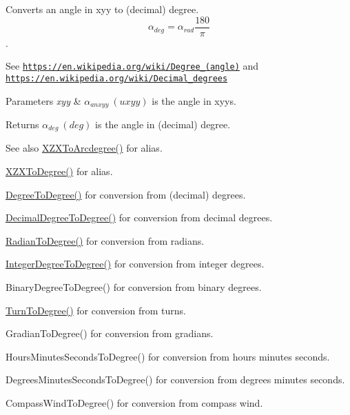 Converts an angle in xyy to (decimal) degree. \[\alpha_{deg}=\alpha_{rad}\frac{180}{\pi}\]. 

See \href{https://en.wikipedia.org/wiki/Degree_(angle)}{\tt https\+://en.\+wikipedia.\+org/wiki/\+Degree\+\_\+(angle)} and \href{https://en.wikipedia.org/wiki/Decimal_degrees}{\tt https\+://en.\+wikipedia.\+org/wiki/\+Decimal\+\_\+degrees} 
\begin{DoxyParams}{Parameters}
{\em xyy} & $\alpha_{anxyy}\ (uxyy)$ is the angle in xyys. \\
\hline
\end{DoxyParams}
\begin{DoxyReturn}{Returns}
$\alpha_{deg}\ (deg)$ is the angle in (decimal) degree. 
\end{DoxyReturn}
\begin{DoxySeeAlso}{See also}
\mbox{\hyperlink{group___e_g_x_math-_angle_conversions-_x_z_x_gade03c99ea870f58dcebd6307beed2364}{X\+Z\+X\+To\+Arcdegree()}} for alias. 

\mbox{\hyperlink{group___e_g_x_math-_angle_conversions-_x_z_x_gaf91d111a3f3558dcd147d3832afc1fd6}{X\+Z\+X\+To\+Degree()}} for alias. 

\mbox{\hyperlink{group___e_g_x_math-_angle_conversions-_degree_gaca157e7d3e99a46a11a04b92680d2574}{Degree\+To\+Degree()}} for conversion from (decimal) degrees. 

\mbox{\hyperlink{group___e_g_x_math-_angle_conversions-_decimal_degree_ga0aa7f2f5dbb00cf4ab303421c6e33ccf}{Decimal\+Degree\+To\+Degree()}} for conversion from decimal degrees. 

\mbox{\hyperlink{group___e_g_x_math-_angle_conversions-_radian_ga25bbce6cdc1c3621f2a158d320e3bc45}{Radian\+To\+Degree()}} for conversion from radians. 

\mbox{\hyperlink{group___e_g_x_math-_angle_conversions-_integer_degree_gaa9b63c6095fd7f8809fcfa2ba1e62235}{Integer\+Degree\+To\+Degree()}} for conversion from integer degrees. 

Binary\+Degree\+To\+Degree() for conversion from binary degrees. 

\mbox{\hyperlink{group___e_g_x_math-_angle_conversions-_turn_ga19eceb6db54a1cf17789639c2a869cb9}{Turn\+To\+Degree()}} for conversion from turns. 

Gradian\+To\+Degree() for conversion from gradians. 

Hours\+Minutes\+Seconds\+To\+Degree() for conversion from hours minutes seconds. 

Degrees\+Minutes\+Seconds\+To\+Degree() for conversion from degrees minutes seconds. 

Compass\+Wind\+To\+Degree() for conversion from compass wind. 
\end{DoxySeeAlso}
\mbox{\label{group___e_g_x_math-_angle_conversions-_x_z_x_ga61b7b63e9e90044636c79b599e86fa2f}} 
